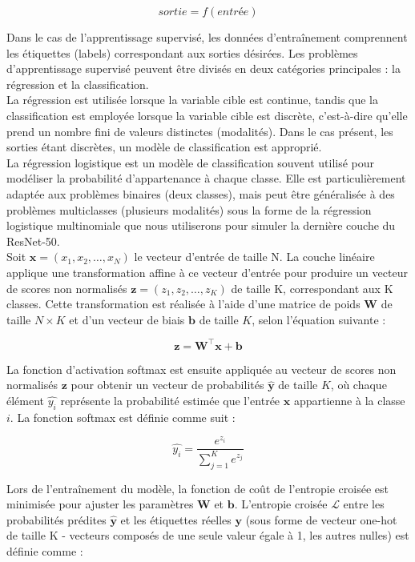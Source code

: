 \documentclass[12pt,english, openany]{book}
\begin{document}
$$sortie = f(entrée)$$

Dans le cas de l'apprentissage supervisé, les données d'entraînement comprennent les étiquettes (labels) correspondant aux sorties désirées. Les problèmes d'apprentissage supervisé peuvent être divisés en deux catégories principales : la régression et la classification.\\

La régression est utilisée lorsque la variable cible est continue, tandis que la classification est employée lorsque la variable cible est discrète, c'est-à-dire qu'elle prend un nombre fini de valeurs distinctes (modalités). Dans le cas présent, les sorties étant discrètes, un modèle de classification est approprié.\\

La régression logistique est un modèle de classification souvent utilisé pour modéliser la probabilité d'appartenance à chaque classe. Elle est particulièrement adaptée aux problèmes binaires (deux classes), mais peut être généralisée à des problèmes multiclasses (plusieurs modalités) sous la forme de la régression logistique multinomiale que nous utiliserons pour simuler la dernière couche du ResNet-50.\\

Soit $\mathbf{x} = (x_1, x_2, \ldots, x_N)$ le vecteur d'entrée de taille N. La couche linéaire applique une transformation affine à ce vecteur d'entrée pour produire un vecteur de scores non normalisés $\mathbf{z} = (z_1, z_2, \ldots, z_K)$ de taille K, correspondant aux K classes. Cette transformation est réalisée à l'aide d'une matrice de poids $\mathbf{W}$ de taille $N \times K$ et d'un vecteur de biais $\mathbf{b}$ de taille $K$, selon l'équation suivante :

$$\mathbf{z} = \mathbf{W}^\top\mathbf{x} + \mathbf{b}$$

La fonction d'activation softmax est ensuite appliquée au vecteur de scores non normalisés $\mathbf{z}$ pour obtenir un vecteur de probabilités $\mathbf{\hat{y}}$ de taille $K$, où chaque élément $\hat{y_i}$ représente la probabilité estimée que l'entrée $\mathbf{x}$ appartienne à la classe $i$. La fonction softmax est définie comme suit :

$$\hat{y_i} = \frac{e^{z_i}}{\sum_{j=1}^{K} e^{z_j}}$$

Lors de l'entraînement du modèle, la fonction de coût de l'entropie croisée est minimisée pour ajuster les paramètres $\mathbf{W}$ et $\mathbf{b}$. L'entropie croisée $\mathcal{L}$ entre les probabilités prédites $\mathbf{\hat{y}}$ et les étiquettes réelles $\mathbf{y}$ (sous forme de vecteur one-hot de taille K - vecteurs composés de une seule valeur égale à 1, les autres nulles) est définie comme :
\end{document}
